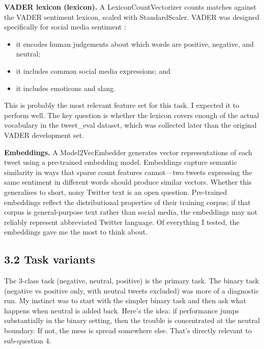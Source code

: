 \documentclass[12pt]{article}
\begin{document}
\textbf{VADER lexicon (lexicon).} A LexiconCountVectorizer counts matches against the VADER sentiment lexicon, scaled with StandardScaler. VADER was designed specifically for social media sentiment \citep{hutto2014vader}:

\begin{itemize}

  \item it encodes human judgements about which words are positive, negative, and neutral;

  \item it includes common social media expressions; and

  \item it includes emoticons and slang.

\end{itemize} This is probably the most relevant feature set for this task. I expected it to perform well. The key question is whether the lexicon covers enough of the actual vocabulary in the tweet\_eval dataset, which was collected later than the original VADER development set.

\textbf{Embeddings.} A Model2VecEmbedder generates vector representations of each tweet using a pre-trained embedding model. Embeddings capture semantic similarity in ways that sparse count features cannot---two tweets expressing the same sentiment in different words should produce similar vectors. Whether this generalises to short, noisy Twitter text is an open question. Pre-trained embeddings reflect the distributional properties of their training corpus; if that corpus is general-purpose text rather than social media, the embeddings may not reliably represent abbreviated Twitter language. Of everything I tested, the embeddings gave me the most to think about.



\subsection*{3.2 Task variants}



The 3-class task (negative, neutral, positive) is the primary task. The binary task (negative vs positive only, with neutral tweets excluded) was more of a diagnostic run. My instinct was to start with the simpler binary task and then ask what happens when neutral is added back. Here's the idea: if performance jumps substantially in the binary setting, then the trouble is concentrated at the neutral boundary. If not, the mess is spread somewhere else. That's directly relevant to sub-question 4.
\end{document}
